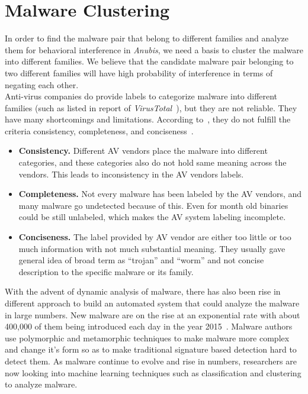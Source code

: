 \section{Malware Clustering}
\label{sec:Malware Clustering}
In order to find the malware pair that belong to different families and analyze them for behavioral interference in \emph{Anubis}, we need a basis to cluster the malware into different families.
We believe that the candidate malware pair belonging to two different families will have high probability of interference in terms of negating each other.\\
Anti-virus companies do provide labels to categorize malware into different families (such as listed in report of \emph{VirusTotal}~\cite[]{virustotal}), but they are not reliable.
They have many shortcomings and limitations.
According to~\citeauthor{bailey}, they do not fulfill the criteria consistency, completeness, and conciseness~\cite[]{bailey}.\\
\begin{itemize}
\item \textbf{Consistency.} Different AV vendors place the malware into different categories, and these categories also do not hold same meaning across the vendors.
This leads to inconsistency in the AV vendors labels.
\item \textbf{Completeness.} Not every malware has been labeled by the AV vendors, and many malware go undetected because of this.
Even for month old binaries could be still unlabeled, which makes the AV system labeling incomplete.
\item \textbf{Conciseness.} The label provided by AV vendor are either too little or too much information with not much substantial meaning.
They usually gave general idea of broad term as ``trojan'' and ``worm'' and not concise description to the specific malware or its family.
\end{itemize}
With the advent of dynamic analysis of malware, there has also been rise in different approach to build an automated system that could analyze the malware in large numbers.
New malware are on the rise at an exponential rate with about 400,000 of them being introduced each day in the year 2015~\cite[]{avtest}.
Malware authors use polymorphic and metamorphic techniques to make malware more complex and change it's form so as to make traditional signature based detection hard to detect them.
As malware continue to evolve and rise in numbers, researchers are now looking into machine learning techniques such as classification and clustering to analyze malware.

